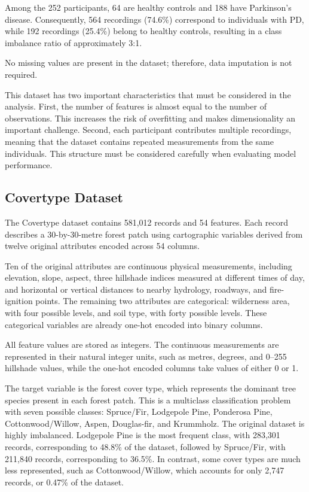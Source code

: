 \documentclass[11pt,a4paper]{article}
\begin{document}
Among the 252 participants, 64 are healthy controls and 188 have Parkinson's
disease. Consequently, 564 recordings (74.6\%) correspond to individuals with
PD, while 192 recordings (25.4\%) belong to healthy controls, resulting in a
class imbalance ratio of approximately 3:1.

No missing values are present in the dataset; therefore, data imputation is
not required.

This dataset has two important characteristics that must be considered in the
analysis. First, the number of features is almost equal to the number of
observations. This increases the risk of overfitting and makes dimensionality
an important challenge. Second, each participant contributes multiple
recordings, meaning that the dataset contains repeated measurements from the
same individuals. This structure must be considered carefully when evaluating
model performance.

\subsection{Covertype Dataset}\label{sec:covertype}

The Covertype dataset contains 581{,}012 records and 54 features. Each record
describes a 30-by-30-metre forest patch using cartographic variables derived
from twelve original attributes encoded across 54 columns.

Ten of the original attributes are continuous physical measurements, including
elevation, slope, aspect, three hillshade indices measured at different times
of day, and horizontal or vertical distances to nearby hydrology, roadways, and
fire-ignition points. The remaining two attributes are categorical: wilderness
area, with four possible levels, and soil type, with forty possible levels.
These categorical variables are already one-hot encoded into binary columns.

All feature values are stored as integers. The continuous measurements are
represented in their natural integer units, such as metres, degrees, and
0--255 hillshade values, while the one-hot encoded columns take values of
either 0 or 1.

The target variable is the forest cover type, which represents the dominant
tree species present in each forest patch. This is a multiclass classification
problem with seven possible classes: Spruce/Fir, Lodgepole Pine, Ponderosa
Pine, Cottonwood/Willow, Aspen, Douglas-fir, and Krummholz. The original
dataset is highly imbalanced. Lodgepole Pine is the most frequent class, with
283{,}301 records, corresponding to 48.8\% of the dataset, followed by
Spruce/Fir, with 211{,}840 records, corresponding to 36.5\%. In contrast, some
cover types are much less represented, such as Cottonwood/Willow, which
accounts for only 2{,}747 records, or 0.47\% of the dataset.
\end{document}
